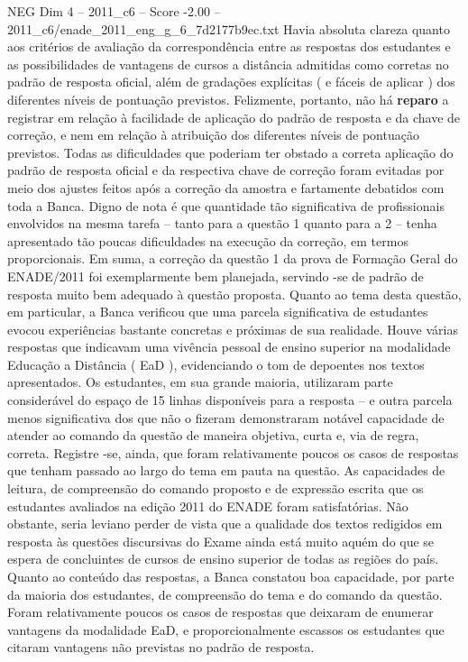 \begin{textsample}{NEG Dim 4 – 2011\_c6 – Score -2.00 – 2011\_c6/enade\_2011\_eng\_g\_6\_7d2177b9ec.txt}
Havia absoluta clareza quanto aos critérios de avaliação da correspondência entre as respostas dos estudantes e as possibilidades de vantagens de cursos a distância admitidas como corretas no padrão de resposta oficial, além de gradações explícitas ( e fáceis de aplicar ) dos diferentes níveis de pontuação previstos.
Felizmente, portanto, não há \textbf{reparo} a registrar em relação à facilidade de aplicação do padrão de resposta e da chave de correção, e nem em relação à atribuição dos diferentes níveis de pontuação previstos.
Todas as dificuldades que poderiam ter obstado a correta aplicação do padrão de resposta oficial e da respectiva chave de correção foram evitadas por meio dos ajustes feitos após a correção da amostra e fartamente debatidos com toda a Banca.
Digno de nota é que quantidade tão significativa de profissionais envolvidos na mesma tarefa – tanto para a questão 1 quanto para a 2 – tenha apresentado tão poucas dificuldades na execução da correção, em termos proporcionais.
Em suma, a correção da questão 1 da prova de Formação Geral do ENADE/2011 foi exemplarmente bem planejada, servindo -se de padrão de resposta muito bem adequado à questão proposta.
Quanto ao tema desta questão, em particular, a Banca verificou que uma parcela significativa de estudantes evocou experiências bastante concretas e próximas de sua realidade.
Houve várias respostas que indicavam uma vivência pessoal de ensino superior na modalidade Educação a Distância ( EaD ), evidenciando o tom de depoentes nos textos apresentados.
Os estudantes, em sua grande maioria, utilizaram parte considerável do espaço de 15 linhas disponíveis para a resposta – e outra parcela menos significativa dos que não o fizeram demonstraram notável capacidade de atender ao comando da questão de maneira objetiva, curta e, via de regra, correta.
Registre -se, ainda, que foram relativamente poucos os casos de respostas que tenham passado ao largo do tema em pauta na questão.
As capacidades de leitura, de compreensão do comando proposto e de expressão escrita que os estudantes avaliados na edição 2011 do ENADE foram satisfatórias.
Não obstante, seria leviano perder de vista que a qualidade dos textos redigidos em resposta às questões discursivas do Exame ainda está muito aquém do que se espera de concluintes de cursos de ensino superior de todas as regiões do país.
Quanto ao conteúdo das respostas, a Banca constatou boa capacidade, por parte da maioria dos estudantes, de compreensão do tema e do comando da questão.
Foram relativamente poucos os casos de respostas que deixaram de enumerar vantagens da modalidade EaD, e proporcionalmente escassos os estudantes que citaram vantagens não previstas no padrão de resposta.

\end{textsample}
